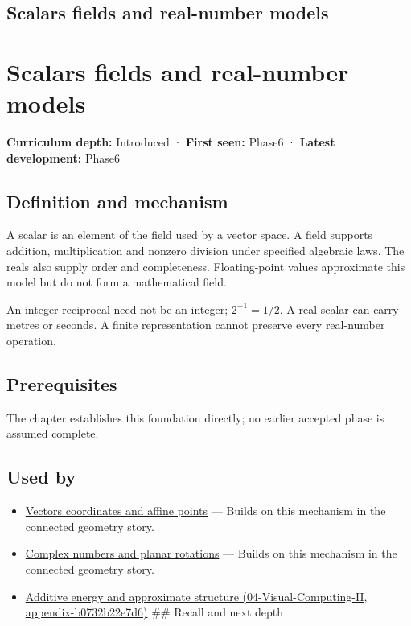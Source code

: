 \hypertarget{appendix-52051ad550fe}{}
\section*{Scalars fields and real-number models}
\chapter{Scalars fields and real-number models}\label{appendix-52051ad550fe-scalars-fields-and-real-number-models}

\textbf{Curriculum depth:} Introduced · \textbf{First seen:} Phase6 · \textbf{Latest development:} Phase6

\section{Definition and mechanism}\label{appendix-52051ad550fe-definition-and-mechanism}

A scalar is an element of the field used by a vector space. A field supports addition, multiplication and nonzero division under specified algebraic laws. The reals also supply order and completeness. Floating-point values approximate this model but do not form a mathematical field.

An integer reciprocal need not be an integer; \(2^{-1}=1/2\). A real scalar can carry metres or seconds. A finite representation cannot preserve every real-number operation.

\section{Prerequisites}\label{appendix-52051ad550fe-prerequisites}

The chapter establishes this foundation directly; no earlier accepted phase is assumed complete.

\section{Used by}\label{appendix-52051ad550fe-used-by}

\begin{itemize}
\item
  \hyperref[appendix-0659864c0aa3]{Vectors coordinates and affine points} --- Builds on this mechanism in the connected geometry story.
\item
  \hyperref[appendix-f77eadcc4a93]{Complex numbers and planar rotations} --- Builds on this mechanism in the connected geometry story.
\item
  \href{../04-Visual-Computing-II/main.pdf\#nameddest=appendix-b0732b22e7d6}{Additive energy and approximate structure (04-Visual-Computing-II, appendix-b0732b22e7d6)} \#\# Recall and next depth
\end{itemize}

